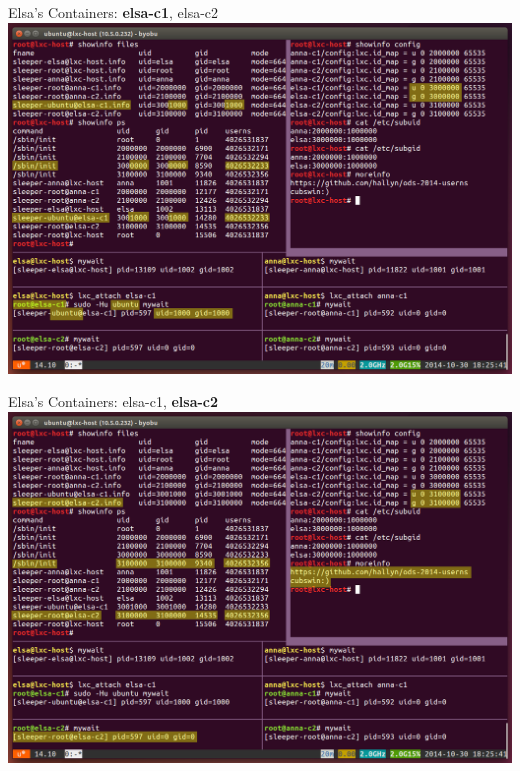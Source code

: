 \documentclass{beamer}
\begin{document}
\begin{frame}
Elsa's Containers: \textbf{elsa-c1}, elsa-c2
\includegraphics[width=\textwidth]{screen-elsa-c1.png}
\end{frame}

\begin{frame}
Elsa's Containers: elsa-c1, \textbf{elsa-c2}
\includegraphics[width=\textwidth]{screen-elsa-c2.png}
\end{frame}
\end{document}
